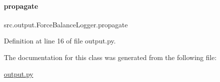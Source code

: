 \paragraph{\texorpdfstring{propagate}{propagate}}
{\footnotesize\ttfamily src.\+output.\+Force\+Balance\+Logger.\+propagate}



Definition at line 16 of file output.\+py.



The documentation for this class was generated from the following file\+:\begin{DoxyCompactItemize}
\item 
\hyperlink{output_8py}{output.\+py}\end{DoxyCompactItemize}
